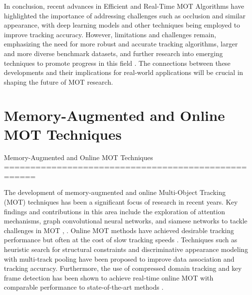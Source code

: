 \documentclass[conference]{IEEEtran}
\begin{document}
In conclusion, recent advances in Efficient and Real-Time MOT Algorithms have highlighted the importance of addressing challenges such as occlusion and similar appearance, with deep learning models and other techniques being employed to improve tracking accuracy. However, limitations and challenges remain, emphasizing the need for more robust and accurate tracking algorithms, larger and more diverse benchmark datasets, and further research into emerging techniques to promote progress in this field \cite{Future Research Directions}. The connections between these developments and their implications for real-world applications will be crucial in shaping the future of MOT research.

\section{Memory-Augmented and Online MOT Techniques}
Memory-Augmented and Online MOT Techniques 
====================================================

The development of memory-augmented and online Multi-Object Tracking (MOT) techniques has been a significant focus of research in recent years. Key findings and contributions in this area include the exploration of attention mechanisms, graph convolutional neural networks, and siamese networks to tackle challenges in MOT \cite{Multiple Object Tracking in Recent Times: A Literature Review}, \cite{Multiple Object Tracking: A Literature Review}. Online MOT methods have achieved desirable tracking performance but often at the cost of slow tracking speeds \cite{Real-time Online Multi-Object Tracking in Compressed Domain}. Techniques such as heuristic search for structural constraints \cite{Heuristic Search for Structural Constraints in Data Association} and discriminative appearance modeling with multi-track pooling \cite{Discriminative Appearance Modeling with Multi-track Pooling for Real-time Multi-object Tracking} have been proposed to improve data association and tracking accuracy. Furthermore, the use of compressed domain tracking and key frame detection has been shown to achieve real-time online MOT with comparable performance to state-of-the-art methods \cite{Real-time Online Multi-Object Tracking in Compressed Domain}.
\end{document}
